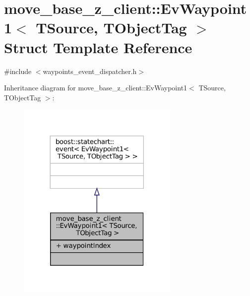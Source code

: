 \hypertarget{structmove__base__z__client_1_1EvWaypoint1}{}\section{move\+\_\+base\+\_\+z\+\_\+client\+:\+:Ev\+Waypoint1$<$ T\+Source, T\+Object\+Tag $>$ Struct Template Reference}
\label{structmove__base__z__client_1_1EvWaypoint1}


{\ttfamily \#include $<$waypoints\+\_\+event\+\_\+dispatcher.\+h$>$}



Inheritance diagram for move\+\_\+base\+\_\+z\+\_\+client\+:\+:Ev\+Waypoint1$<$ T\+Source, T\+Object\+Tag $>$\+:
\nopagebreak
\begin{figure}[H]
\begin{center}
\leavevmode
\includegraphics[width=221pt]{structmove__base__z__client_1_1EvWaypoint1__inherit__graph}
\end{center}
\end{figure}


